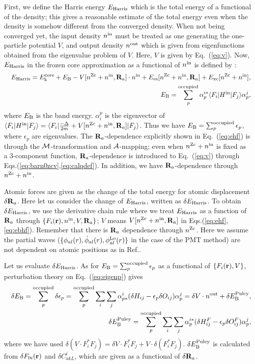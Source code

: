 \documentclass[twocolumn,showpacs,preprintnumbers,amsmath,amssymb,floatfix]{revtex4-1}
\newcommand{\bfr}{{\bf r}}
\newcommand{\bfR}{{\bf R}}
\def\calR{{\cal A}}
\newcommand{\req}[1]{\mbox{Eq.~\!(\ref{#1})}}
\def\nzc{n^{\rm Zc}}
\def\MM{{\cal M}}
\def\ehf{E_{\rm Harris}}
\def\nin{n^{\rm in}}
\def\nout{n^{\rm out}}
\def\Vin{V}
\def\philo{{\phi}^{\rm Lo}_{al}}
\def\nzc{n^{\rm Zc}}
\def\MM{{\cal M}}
\def\ehf{E_{\rm Harris}}
\def\nin{n^{\rm in}}
\def\nout{n^{\rm out}}
\def\Vin{V}
\def\philo{{\phi}^{\rm Lo}_{al}}
\begin{document}
\begin{widetext}
First, we define the Harris energy $\ehf$ \cite{molforce,harris85} 
which is the total energy of a functional of the density; this gives
a reasonable estimate of the total energy even when the density is
somehow different from the converged density.
When not being converged yet, the input density $\nin$
must be treated as one generating the one-particle potential $V$,
and output density $\nout$ which is given from eigenfunctions
obtained from the eigenvalue problem of $V$. Here, $
V$ is given by \req{eq:v}. Now, $\ehf$ in the frozen core
approximation as a functional of $\nin$ is defined by \cite{molforce}:
\begin{eqnarray}
&&\ehf = E_{\rm k}^{\rm core} + E_{\rm B} - V[\nzc+\nin,\bfR_a] \cdot \nin 
+ E_{\rm es}[\nzc+\nin,\bfR_a] + E_{\rm xc}[\nzc+\nin],
\label{eq:ehf} \\
&&E_{\rm B} = \sum_p^{\rm occupied}
\alpha_{p}^{i*} 
\langle F_i|H^{\rm in}|F_j \rangle 
\alpha_p^j,
\label{eq:ebhf}
\end{eqnarray}
where $E_{\rm B}$ is the band energy.
$\alpha_i^p$ is the eigenvector of 
$\langle F_i|H^{\rm in}|F_j \rangle=
\langle F_i| \frac{-\Delta}{2m} + V[\nzc+\nin,\bfR_a] |F_j\rangle$.
Thus we have $E_{\rm B}=\sum^{\rm occupied}_p \epsilon_p$, where $\epsilon_p$ are eigenvalues.
The $\bfR_a$-dependence explicitly shown in \req{eq:ehf} is
through the $\MM$-transformation and $\calR$-mapping;
even when $\nzc+\nin$ is fixed as a 3-component function,
$\bfR_a$-dependence is introduced to \req{eq:v} through Eqs.(\ref{eq:barn0zcv},\ref{eq:calqdef}).
In addition, we have $\bfR_a$-dependence through $\nzc+\nin$.

Atomic forces are given as the change of the total energy 
for atomic displacement $\delta \bfR_a$.
Here let us consider the change of $\ehf$, written as $\delta \ehf$.
To obtain $\delta \ehf$, we use the derivative chain rule where we
treat $\ehf$ as a function of $\bfR_a$ through
$\{F_i(\bfr), \nin, \Vin, \bfR_a\}$; $\Vin$ means $V[\nzc+\nin,\bfR_a]$ in 
Eqs.(\ref{eq:ehf},\ref{eq:ebhf}).
Remember that there is $\bfR_a$ dependence through $\nzc$.
Here we assume the partial waves
($\{\phi_{al}(r),\dot{\phi}_{al}(r),\philo(r) \}$ in the case of the PMT
method) are not dependent on atomic positions as in Ref.\cite{molforce}.

Let us evaluate $\delta \ehf$. 
As for $E_{\rm B}=\sum_p^{\rm occupied} \epsilon_p$ 
as a functional of $\{F_i(\bfr),\Vin\}$, perturbation theory on
\req{eq:eigenp} gives
\begin{eqnarray}
&&\delta E_{\rm B} = \sum_p^{\rm occupied} \delta \epsilon_p
=\sum_p^{\rm occupied} \sum_i \sum_j 
\alpha_{p*}^i (\delta H_{ij} -\epsilon_p \delta O_{ij}) \alpha_p^j
=\delta \Vin\cdot \nout + \delta E_{\rm B}^{\rm Puley}, \label{eq:deleb}\\
&&\delta E_{\rm B}^{\rm Puley}=\sum_p^{\rm occupied} \sum_i \sum_j 
\alpha_{p}^{i*} (\delta H^F_{ij} -\epsilon_p \delta O^F_{ij}) \alpha_p^j,
\end{eqnarray}
where we have used $\delta (\Vin\cdot F^*_i F_j)=\delta \Vin 
\cdot F^*_i F_j + \Vin\cdot \delta (F^*_i F_j)$.
$\delta E_{\rm B}^{\rm Puley}$ is calculated from 
$\delta F_{0i}(\bfr)$ and $\delta C^i_{akL}$, which 
are given as a functional of $\delta \bfR_a$.


\end{widetext}
\end{document}
